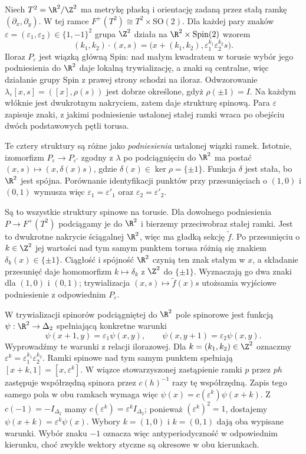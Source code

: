 \begin{przyklad}
\label{prz:lin31-spin-torus}
Niech $T^2=\R^2/\Z^2$ ma metrykę płaską i orientację
zadaną przez stałą ramkę $(\partial_x,\partial_y)$.
W tej ramce $F^+(T^2)\cong T^2\times\mathrm{SO}(2)$.
Dla każdej pary znaków
$\varepsilon=(\varepsilon_1,\varepsilon_2)\in\{1,-1\}^2$
grupa $\Z^2$ działa na $\R^2\times\operatorname{Spin}(2)$ wzorem
\[
 (k_1,k_2)\cdot(x,s)
  =\bigl(x+(k_1,k_2),
          \varepsilon_1^{k_1}\varepsilon_2^{k_2}s\bigr).
\]
Iloraz $P_\varepsilon$ jest wiązką główną Spin:
nad małym kwadratem w torusie wybór jego podniesienia do $\R^2$
daje lokalną trywializację, a znaki są centralne,
więc działanie grupy Spin z prawej strony schodzi na iloraz.
Odwzorowanie
$\lambda_\varepsilon[x,s]=([x],\rho(s))$
jest dobrze określone, gdyż $\rho(\pm1)=I$.
Na każdym włóknie jest dwukrotnym nakryciem, zatem daje
strukturę spinową. Para $\varepsilon$ zapisuje znaki,
z jakimi podniesienie ustalonej stałej ramki wraca
po obejściu dwóch podstawowych pętli torusa.

Te cztery struktury są różne jako \emph{podniesienia}
ustalonej wiązki ramek. Istotnie, izomorfizm
$P_\varepsilon\to P_{\varepsilon'}$ zgodny z $\lambda$
po podciągnięciu do $\R^2$ ma postać
$(x,s)\mapsto(x,\delta(x)s)$, gdzie
$\delta(x)\in\ker\rho=\{\pm1\}$.
Funkcja $\delta$ jest stała, bo $\R^2$ jest spójna.
Porównanie identyfikacji punktów przy przesunięciach
o $(1,0)$ i $(0,1)$ wymusza więc
$\varepsilon_1=\varepsilon'_1$ oraz
$\varepsilon_2=\varepsilon'_2$.

Są to wszystkie struktury spinowe na torusie. Dla dowolnego
podniesienia $P\to F^+(T^2)$ podciągamy je do $\R^2$ i bierzemy
przeciwobraz stałej ramki. Jest to dwukrotne nakrycie
ściągalnej $\R^2$, więc ma gładką sekcję $\widetilde f$.
Po przesunięciu o $k\in\Z^2$ jej wartości nad tym samym
punktem torusa różnią się znakiem $\delta_k(x)\in\{\pm1\}$.
Ciągłość i spójność $\R^2$ czynią ten znak stałym w $x$,
a składanie przesunięć daje homomorfizm
$k\mapsto\delta_k$ z $\Z^2$ do $\{\pm1\}$.
Wyznaczają go dwa znaki dla $(1,0)$ i $(0,1)$;
trywializacja $(x,s)\mapsto\widetilde f(x)s$ utożsamia
wyjściowe podniesienie z odpowiednim $P_\varepsilon$.

W trywializacji spinorów podciągniętej do $\R^2$
pole spinorowe jest funkcją $\psi:\R^2\to\Delta_2$
spełniającą konkretne warunki
\[
 \psi(x+1,y)=\varepsilon_1\psi(x,y),
 \qquad
 \psi(x,y+1)=\varepsilon_2\psi(x,y).
\]
Wyprowadźmy te warunki z relacji ilorazowej.
Dla $k=(k_1,k_2)\in\Z^2$ oznaczmy
$\varepsilon^k=\varepsilon_1^{k_1}\varepsilon_2^{k_2}$.
Ramki spinowe nad tym samym punktem spełniają
$[x+k,1]=[x,\varepsilon^k]$.
W wiązce stowarzyszonej zastąpienie ramki $p$ przez $p h$
zastępuje współrzędną spinora przez $c(h)^{-1}$ razy tę współrzędną.
Zapis tego samego pola w obu ramkach wymaga więc
$\psi(x)=c(\varepsilon^k)\psi(x+k)$.
Z $c(-1)=-I_{\Delta_2}$ mamy
$c(\varepsilon^k)=\varepsilon^k I_{\Delta_2}$;
ponieważ $(\varepsilon^k)^2=1$, dostajemy
$\psi(x+k)=\varepsilon^k\psi(x)$.
Wybory $k=(1,0)$ i $k=(0,1)$ dają oba wypisane warunki.
Wybór znaku $-1$ oznacza więc antyperiodyczność
w odpowiednim kierunku, choć zwykłe wektory styczne
są okresowe w obu kierunkach.
\end{przyklad}

